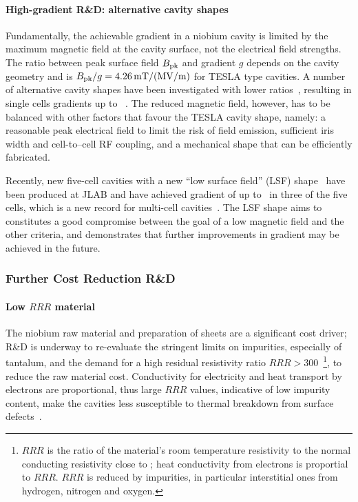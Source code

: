 \paragraph{High-gradient R\&D: alternative cavity shapes}

Fundamentally, the achievable gradient in a niobium cavity is limited by the maximum magnetic field at the cavity surface, not the electrical field strengths.
The ratio between peak surface field $B_{\mathrm{pk}}$ and gradient $g$ depends on the cavity geometry and is $B_{\mathrm{pk}}/g = 4.26\,{\mathrm{mT / (MV/m)}}$ for TESLA type cavities.
A number of alternative cavity shapes have been investigated with lower ratios~\cite{Geng:2006wf},
resulting in single cells gradients up to ~\cite{Eremeev:2007zza}.
The reduced magnetic field, however, has to be balanced with other factors that favour the TESLA cavity shape, namely: a reasonable peak electrical field to limit the risk of field emission, sufficient iris width and cell-to--cell RF coupling, and a mechanical shape that can be efficiently fabricated.

Recently, new five-cell cavities with a new ``low surface field'' (LSF) shape~\cite{Li:2008a} have been produced at JLAB and have achieved gradient of up to~ in three of the five cells, which is a new record for multi-cell cavities~\cite{bib:Geng:2018.lcws}. 
The LSF shape aims to constitutes a good compromise between the goal of a low magnetic field and the other criteria, and demonstrates that further improvements in gradient may be achieved in the future.


\subsubsection{Further Cost Reduction R\&D}

\paragraph{Low $RRR$ material}

The niobium raw material and preparation of sheets  are a significant cost driver; R\&D is underway to re-evaluate the stringent limits on impurities, especially of tantalum, and the demand for a high residual resistivity ratio $RRR > 300$~\footnote{$RRR$ is the ratio of the material's room temperature resistivity to the normal conducting resistivity close to ; heat conductivity from electrons is proportial to $RRR$. $RRR$ is reduced by impurities, in particular interstitial ones  from hydrogen, nitrogen and oxygen.}, to reduce the raw material cost. 
Conductivity for electricity and heat transport by electrons are proportional,
thus large $RRR$ values, indicative of low impurity content, make the cavities less susceptible to thermal breakdown from surface defects~\cite{bib:Kubo:2018.ttc}.

